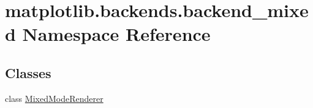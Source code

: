 \hypertarget{namespacematplotlib_1_1backends_1_1backend__mixed}{}\section{matplotlib.\+backends.\+backend\+\_\+mixed Namespace Reference}
\label{namespacematplotlib_1_1backends_1_1backend__mixed}
\subsection*{Classes}
\begin{DoxyCompactItemize}
\item 
class \hyperlink{classmatplotlib_1_1backends_1_1backend__mixed_1_1MixedModeRenderer}{Mixed\+Mode\+Renderer}
\end{DoxyCompactItemize}
